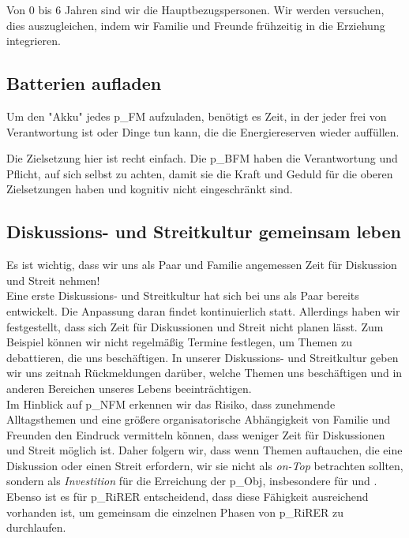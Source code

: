Von 0 bis 6 Jahren sind wir die Hauptbezugspersonen. Wir werden versuchen, dies auszugleichen, indem wir Familie und Freunde frühzeitig in die Erziehung integrieren.

\subsection{Batterien aufladen}

Um den "Akku" jedes \gls{p_FM} aufzuladen, benötigt es Zeit, in der jeder frei von Verantwortung ist oder Dinge tun kann, die die Energiereserven wieder auffüllen.

Die Zielsetzung hier ist recht einfach. Die \gls{p_BFM} haben die Verantwortung und Pflicht, auf sich selbst zu achten, damit sie die Kraft und Geduld für die oberen Zielsetzungen haben und kognitiv nicht eingeschränkt sind.

\subsection{Diskussions- und Streitkultur gemeinsam leben}\label{subsec_LeitendePrinzipien_Diskussionskultur}

Es ist wichtig, dass wir uns als Paar und Familie angemessen Zeit für Diskussion und Streit nehmen!\\

Eine erste Diskussions- und Streitkultur hat sich bei uns als Paar bereits entwickelt. Die Anpassung daran findet kontinuierlich statt. Allerdings haben wir festgestellt, dass sich Zeit für Diskussionen und Streit nicht planen lässt. Zum Beispiel können wir nicht regelmäßig Termine festlegen, um Themen zu debattieren, die uns beschäftigen. In unserer Diskussions- und Streitkultur geben wir uns zeitnah Rückmeldungen darüber, welche Themen uns beschäftigen und in anderen Bereichen unseres Lebens beeinträchtigen.\\

Im Hinblick auf \gls{p_NFM} erkennen wir das Risiko, dass zunehmende Alltagsthemen und eine größere organisatorische Abhängigkeit von Familie und Freunden den Eindruck vermitteln können, dass weniger Zeit für Diskussionen und Streit möglich ist. Daher folgern wir, dass wenn Themen auftauchen, die eine Diskussion oder einen Streit erfordern, wir sie nicht als \textit{on-Top} betrachten sollten, sondern als \textit{Investition} für die Erreichung der \gls{p_Obj}, insbesondere für \NFMOOne und \NFMOThree. Ebenso ist es für \gls{p_RiRER} entscheidend, dass diese Fähigkeit ausreichend vorhanden ist, um gemeinsam die einzelnen Phasen von \gls{p_RiRER} zu durchlaufen.
